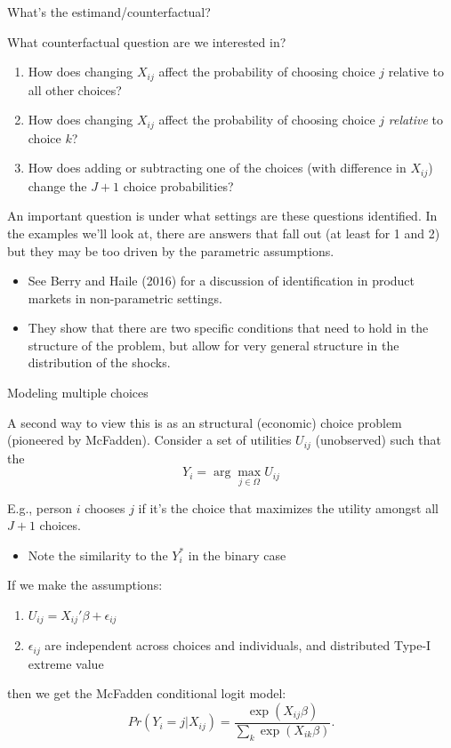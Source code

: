 \documentclass[notes,11pt, aspectratio=169]{beamer}
\newenvironment{wideitemize}{\itemize\addtolength{\itemsep}{10pt}}{\enditemize}
\begin{document}
\begin{frame}{What's the estimand/counterfactual? }
  \begin{wideitemize}
  \item What counterfactual question are we interested in?
    \begin{enumerate}
  \item How does changing $X_{ij}$ affect the probability
    of choosing choice $j$ relative to all other choices?
  \item How does changing $X_{ij}$ affect the probability
    of choosing choice $j$ \emph{relative} to choice $k$?
  \item How does adding or subtracting one of the choices (with
    difference in $X_{ij}$) change the $J+1$ choice probabilities?
  \end{enumerate}
\item An important question is under what settings are these questions
  identified. In the examples we'll look at, there are answers that
  fall out (at least for 1 and 2) but they may be too driven by the
  parametric assumptions.
  \begin{itemize}
  \item See Berry and Haile (2016) for a discussion of identification
    in product markets in non-parametric settings.
  \item They show that there are two specific conditions that need to
    hold in the structure of the problem, but allow for very general
    structure in the distribution of the shocks.
  \end{itemize}
  \end{wideitemize}
\end{frame}

\begin{frame}{Modeling multiple choices}
    \begin{wideitemize}
    \item A second way to view this is as an structural (economic)
      choice problem (pioneered by McFadden). Consider a set of
      utilities $U_{ij}$ (unobserved) such that the
      $$Y_{i} = \arg\max_{j \in \Omega}U_{ij}$$
    \item E.g., person $i$ chooses $j$ if it's the choice that
      maximizes the utility amongst all $J+1$ choices.
      \begin{itemize}
      \item Note the similarity to the $Y^{*}_{i}$ in the binary case
      \end{itemize}

    \item If we make the assumptions:
      \begin{enumerate}
      \item  $U_{ij} = X_{ij}'\beta + \epsilon_{ij}$
      \item $\epsilon_{ij}$ are independent across choices and
        individuals, and distributed Type-I extreme value
      \end{enumerate}
      then we get the McFadden conditional logit model:
      $$Pr(Y_{i} = j | X_{ij}) = \frac{\exp(X_{ij}\beta)}{\sum_{k}\exp(X_{ik}\beta)}.$$
  \end{wideitemize}
\end{frame}
\end{document}
